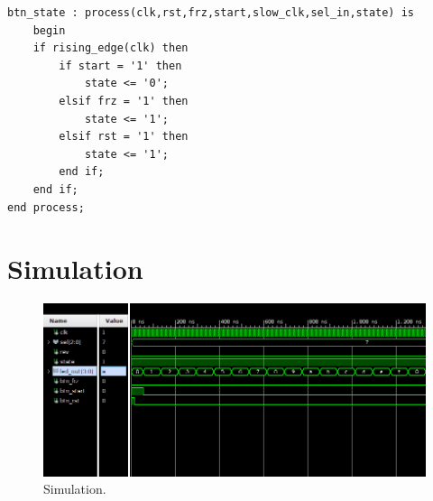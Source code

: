 \documentclass[11pt, a4paper]{article}
\begin{document}
\begin{lstlisting}[style=vhdl,label={lst:btn_state},caption={\texttt{btn\_state} process.}]
btn_state : process(clk,rst,frz,start,slow_clk,sel_in,state) is
    begin
    if rising_edge(clk) then
        if start = '1' then
            state <= '0';
        elsif frz = '1' then
            state <= '1';
        elsif rst = '1' then
            state <= '1';
        end if;
    end if;
end process;\end{lstlisting}

\section{Simulation}

\begin{figure}[H]
\centering
\includegraphics[width=1\textwidth]{../main/image/sim.png}
\caption{\label{fig:board_implementation} Simulation.}
\end{figure}
\end{document}
